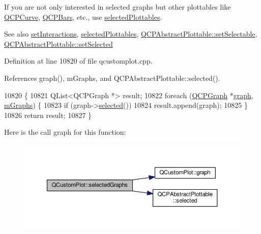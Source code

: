 If you are not only interested in selected graphs but other plottables like \hyperlink{class_q_c_p_curve}{Q\+C\+P\+Curve}, \hyperlink{class_q_c_p_bars}{Q\+C\+P\+Bars}, etc., use \hyperlink{class_q_custom_plot_a6721b8c689bb7f2f400987e580508fe8}{selected\+Plottables}.

\begin{DoxySeeAlso}{See also}
\hyperlink{class_q_custom_plot_a5ee1e2f6ae27419deca53e75907c27e5}{set\+Interactions}, \hyperlink{class_q_custom_plot_a6721b8c689bb7f2f400987e580508fe8}{selected\+Plottables}, \hyperlink{class_q_c_p_abstract_plottable_a22c69299eb5569e0f6bf084877a37dc4}{Q\+C\+P\+Abstract\+Plottable\+::set\+Selectable}, \hyperlink{class_q_c_p_abstract_plottable_afbd5428c2952f59d952e11ab5cd79176}{Q\+C\+P\+Abstract\+Plottable\+::set\+Selected} 
\end{DoxySeeAlso}


Definition at line 10820 of file qcustomplot.\+cpp.



References graph(), m\+Graphs, and Q\+C\+P\+Abstract\+Plottable\+::selected().


\begin{DoxyCode}
10820                                                     \{
10821   QList<QCPGraph *> result;
10822   \textcolor{keywordflow}{foreach} (\hyperlink{class_q_c_p_graph}{QCPGraph} *\hyperlink{class_q_custom_plot_a80c40ced2a74eefe9e92de1e82ba2274}{graph}, \hyperlink{class_q_custom_plot_a38676b141ac8005fca4882a73ddfaf59}{mGraphs}) \{
10823     \textcolor{keywordflow}{if} (graph->\hyperlink{class_q_c_p_abstract_plottable_ab901903adcb0e29467d63de72340ab29}{selected}())
10824       result.append(graph);
10825   \}
10826   \textcolor{keywordflow}{return} result;
10827 \}
\end{DoxyCode}


Here is the call graph for this function\+:\nopagebreak
\begin{figure}[H]
\begin{center}
\leavevmode
\includegraphics[width=350pt]{class_q_custom_plot_ad2a0493bdd01e7aa99a4209ae3a5b67b_cgraph}
\end{center}
\end{figure}


